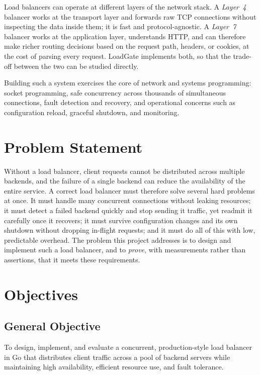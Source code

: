 \documentclass[11pt,a4paper]{report}
\begin{document}
Load balancers can operate at different layers of the network stack. A \emph{Layer~4} balancer
works at the transport layer and forwards raw TCP connections without inspecting the data
inside them; it is fast and protocol-agnostic. A \emph{Layer~7} balancer works at the
application layer, understands HTTP, and can therefore make richer routing decisions based on
the request path, headers, or cookies, at the cost of parsing every request. LoadGate
implements both, so that the trade-off between the two can be studied directly.

Building such a system exercises the core of network and systems programming: socket
programming, safe concurrency across thousands of simultaneous connections, fault detection
and recovery, and operational concerns such as configuration reload, graceful shutdown, and
monitoring.

\section{Problem Statement}
Without a load balancer, client requests cannot be distributed across multiple backends, and
the failure of a single backend can reduce the availability of the entire service. A correct
load balancer must therefore solve several hard problems at once. It must handle many
concurrent connections without leaking resources; it must detect a failed backend quickly and
stop sending it traffic, yet readmit it carefully once it recovers; it must survive
configuration changes and its own shutdown without dropping in-flight requests; and it must do
all of this with low, predictable overhead. The problem this project addresses is to design
and implement such a load balancer, and to \emph{prove}, with measurements rather than
assertions, that it meets these requirements.

\section{Objectives}
\subsection{General Objective}
To design, implement, and evaluate a concurrent, production-style load balancer in Go that
distributes client traffic across a pool of backend servers while maintaining high
availability, efficient resource use, and fault tolerance.
\end{document}

